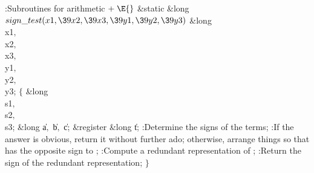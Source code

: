 \Y\B\4:Subroutines for arithmetic\X${}\mathrel+\E{}$\6
\1\1\&{static} \&{long} ${}\\{sign\_test}(\\{x1},\39\\{x2},\39\\{x3},\39\\{y1},%
\39\\{y2},\39\\{y3}){}$\6
\&{long} \\{x1}${},{}$ \\{x2}${},{}$ \\{x3}${},{}$ \\{y1}${},{}$ \\{y2}${},{}$ %
\\{y3};\2\2\6
${}\{{}$\5
\1\&{long} \\{s1}${},{}$ \\{s2}${},{}$ \\{s3};\6
\&{long} \|a${},{}$ \|b${},{}$ \|c;\6
\&{register} \&{long} \|t;\7
:Determine the signs of the terms\X;\6
:If the answer is obvious, return it without further ado; otherwise,
arrange things so that  has the opposite sign to \X;\6
:Compute a redundant representation of \X;\6
:Return the sign of the redundant representation\X;\6
\4${}\}{}$\2\par
\fi

